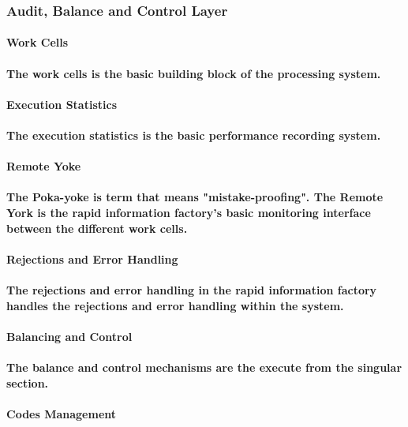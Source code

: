 \documentclass{acm_proc_article-sp}
\begin{document}
\subsubsection{Audit, Balance and Control Layer}
\paragraph{\textbf{Work Cells}}
\paragraph{The work cells \cite{feld2000lean} is the basic building block of the processing system.}
\paragraph{\textbf{Execution Statistics}}
\paragraph{The execution statistics is the basic performance recording system.}
\paragraph{\textbf{Remote Yoke}}
\paragraph{The Poka-yoke is term that means "mistake-proofing". The Remote York is the rapid information factory's basic monitoring interface between the different work cells. }
\paragraph{\textbf{Rejections and Error Handling}}
\paragraph{The rejections and error handling in the rapid information factory handles the rejections and error handling within the system.}
\paragraph{Balancing and Control}
\paragraph{The balance and control mechanisms are the execute from the singular section.}
\paragraph{Codes Management}
\end{document}
